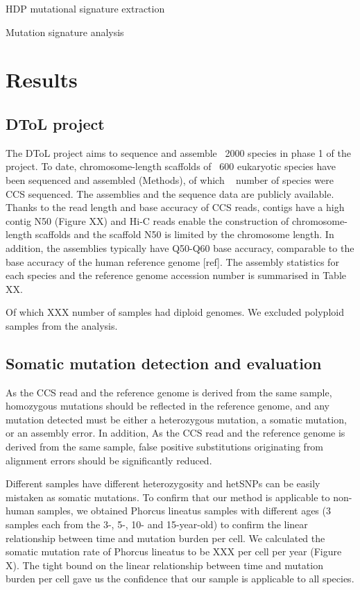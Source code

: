 HDP mutational signature extraction



Mutation signature analysis


\section{Results}

\subsection{DToL project}

The DToL project aims to sequence and assemble ~2000 species in phase 1 of the project. To date, chromosome-length scaffolds of ~600 eukaryotic species have been sequenced and assembled (Methods), of which ~ number of species were CCS sequenced. The assemblies and the sequence data are publicly available. Thanks to the read length and base accuracy of CCS reads, contigs have a high contig N50 (Figure XX) and Hi-C reads enable the construction of chromosome-length scaffolds and the scaffold N50 is limited by the chromosome length. In addition, the assemblies typically have Q50-Q60 base accuracy, comparable to the base accuracy of the human reference genome [ref]. The assembly statistics for each species and the reference genome accession number is summarised in Table XX.

Of which XXX number of samples had diploid genomes. We excluded polyploid samples from the analysis.

\subsection{Somatic mutation detection and evaluation}

As the CCS read and the reference genome is derived from the same sample, homozygous mutations should be reflected in the reference genome, and any mutation detected must be either a heterozygous mutation, a somatic mutation, or an assembly error. In addition, As the CCS read and the reference genome is derived from the same sample, false positive substitutions originating from alignment errors should be significantly reduced. 

Different samples have different heterozygosity and hetSNPs can be easily mistaken as somatic mutations. To confirm that our method is applicable to non-human samples, we obtained Phorcus lineatus samples with different ages (3 samples each from the 3-, 5-, 10- and 15-year-old) to confirm the linear relationship between time and mutation burden per cell. We calculated the somatic mutation rate of Phorcus lineatus to be XXX per cell per year (Figure X). The tight bound on the linear relationship between time and mutation burden per cell gave us the confidence that our sample is applicable to all species.

